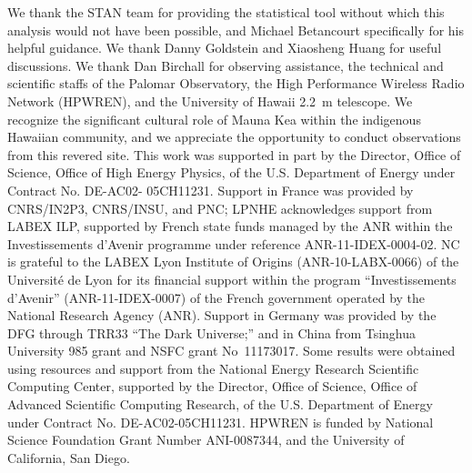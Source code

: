 \documentclass{aastex61}   	%
\begin{document}
\acknowledgments
We thank the STAN team for providing the statistical tool without which this analysis would not have been possible,
and Michael Betancourt specifically for his helpful guidance.  We thank Danny Goldstein and
Xiaosheng Huang for useful discussions.
We thank Dan Birchall for observing assistance, the technical and
scientific staffs of the Palomar Observatory, the High Performance
Wireless Radio Network (HPWREN), and the University of Hawaii 2.2~m
telescope.  We recognize the significant cultural role of Mauna Kea
within the indigenous Hawaiian community, and we appreciate the
opportunity to conduct observations from this revered site.  This
work was supported in part by the Director, Office of Science,
Office of High Energy Physics, of the U.S. Department of Energy
under Contract No. DE-AC02- 05CH11231.  Support in France was
provided by CNRS/IN2P3, CNRS/INSU, and PNC; LPNHE acknowledges
support from LABEX ILP, supported by French state funds managed by
the ANR within the Investissements d'Avenir programme under reference
ANR-11-IDEX-0004-02.  NC is grateful to the LABEX Lyon Institute
of Origins (ANR-10-LABX-0066) of the Universit\'e de Lyon for its
financial support within the program ``Investissements d'Avenir''
(ANR-11-IDEX-0007) of the French government operated by the National
Research Agency (ANR).  Support in Germany was provided by the DFG
through TRR33 ``The Dark Universe;'' and in China from Tsinghua
University 985 grant and NSFC grant No~11173017.  Some results were
obtained using resources and support from the National Energy
Research Scientific Computing Center, supported by the Director,
Office of Science, Office of Advanced Scientific Computing Research,
of the U.S. Department of Energy under Contract No. DE-AC02-05CH11231.
HPWREN is funded by National Science Foundation Grant Number
ANI-0087344, and the University of California, San Diego.




\end{document}
